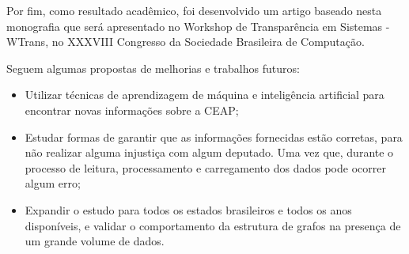 Por fim, como resultado acadêmico, foi desenvolvido um artigo baseado nesta monografia que será apresentado no Workshop de Transparência em Sistemas - WTrans, no XXXVIII Congresso da Sociedade Brasileira de Computação.

	Seguem algumas propostas de melhorias e trabalhos futuros:
	
	\begin{itemize}
		\item Utilizar técnicas de aprendizagem de máquina e inteligência artificial para encontrar novas informações sobre a CEAP;
		\item Estudar formas de garantir que as informações fornecidas estão corretas, para não realizar alguma injustiça com algum deputado. Uma vez que, durante o processo de leitura, processamento e carregamento dos dados pode ocorrer algum erro;
		\item Expandir o estudo para todos os estados brasileiros e todos os anos disponíveis, e validar o comportamento da estrutura de grafos na presença de um grande volume de dados.
	\end{itemize}